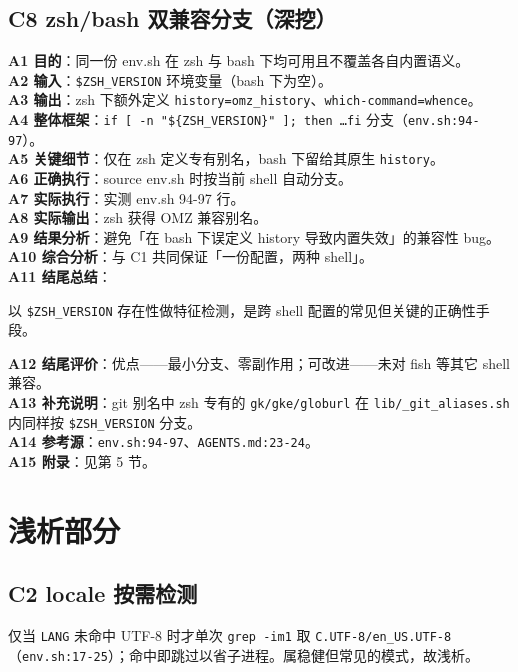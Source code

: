 \documentclass[UTF8]{ctexart}
\begin{document}
\subsection{C8 zsh/bash 双兼容分支（深挖）}
\textbf{A1 目的}：同一份 env.sh 在 zsh 与 bash 下均可用且不覆盖各自内置语义。\\
\textbf{A2 输入}：\texttt{\$ZSH\_VERSION} 环境变量（bash 下为空）。\\
\textbf{A3 输出}：zsh 下额外定义 \texttt{history=omz\_history}、\texttt{which-command=whence}。\\
\textbf{A4 整体框架}：\texttt{if [ -n "\$\{ZSH\_VERSION\}" ]; then \ldots fi} 分支（\texttt{\nolinkurl{env.sh:94-97}}）。\\
\textbf{A5 关键细节}：仅在 zsh 定义专有别名，bash 下留给其原生 \texttt{history}。\\
\textbf{A6 正确执行}：source env.sh 时按当前 shell 自动分支。\\
\textbf{A7 实际执行}：实测 env.sh 94-97 行。\\
\textbf{A8 实际输出}：zsh 获得 OMZ 兼容别名。\\
\textbf{A9 结果分析}：避免「在 bash 下误定义 history 导致内置失效」的兼容性 bug。\\
\textbf{A10 综合分析}：与 C1 共同保证「一份配置，两种 shell」。\\
\textbf{A11 结尾总结}：\begin{algobox}以 \texttt{\$ZSH\_VERSION} 存在性做特征检测，是跨 shell 配置的常见但关键的正确性手段。\end{algobox}
\textbf{A12 结尾评价}：优点——最小分支、零副作用；可改进——未对 fish 等其它 shell 兼容。\\
\textbf{A13 补充说明}：git 别名中 zsh 专有的 \texttt{gk/gke/globurl} 在 \texttt{lib/\_git\_aliases.sh} 内同样按 \texttt{\$ZSH\_VERSION} 分支。\\
\textbf{A14 参考源}：\texttt{\nolinkurl{env.sh:94-97}}、\texttt{\nolinkurl{AGENTS.md:23-24}}。\\
\textbf{A15 附录}：见第 5 节。

\section{浅析部分}
\subsection{C2 locale 按需检测}
仅当 \texttt{LANG} 未命中 UTF-8 时才单次 \texttt{grep -im1} 取 \texttt{C.UTF-8/en\_US.UTF-8}
（\texttt{\nolinkurl{env.sh:17-25}}）；命中即跳过以省子进程。属稳健但常见的模式，故浅析。
\end{document}
